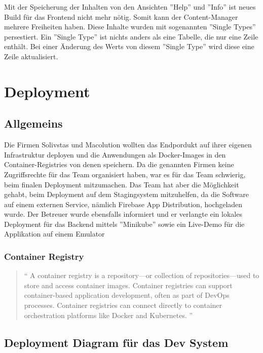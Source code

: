 Mit der Speicherung der Inhalten von den Ansichten ''Help'' und ''Info''  ist neues Build für das Frontend nicht mehr nötig.
Somit kann der Content-Manager mehrere Freiheiten haben.
Diese Inhalte wurden mit sogenannten ''Single Types'' persestiert.
Ein ''Single Type'' ist nichts anders als eine Tabelle, die nur eine Zeile enthält.
Bei einer Änderung des Werts von diesem ''Single Type'' wird diese eine Zeile aktualisiert.


\section{Deployment}

\subsection{Allgemeins}

Die Firmen Solivstas und Macolution wollten das Endpordukt auf ihrer eigenen
Infrastruktur deployen und die Anwendungen
als Docker-Images in den Container-Registries von denen speichern.
Da die genannten Firmen keine Zugriffsrechte für das Team organisiert haben,
war es für das Team schwierig, beim finalen Deployment mitzumachen. Das Team hat aber die Möglichkeit gehabt,
beim Deployment auf dem Stagingsystem mitzuhelfen, da die Software auf einem externen Service, nämlich
Firebase App Distribution, hochgeladen wurde.
Der Betreuer wurde ebensfalls informiert und er verlangte ein lokales Deployment für das Backend mittels ''Minikube'' sowie ein Live-Demo für die Applikation auf einem Emulator


\subsubsection{Container Registry}

\begin{quotation}
  ``
  A container registry is a repository—or collection of repositories—used to store and access container
  images. Container registries can support container-based application development,
  often as part of DevOps processes.
  Container registries can connect directly to container orchestration platforms like Docker and Kubernetes.
  ''
  \cite{container-registry}
\end{quotation}


\subsection{Deployment Diagram für das Dev System}

